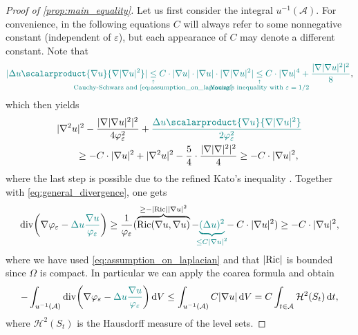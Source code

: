 \documentclass[draft]{amsart}
\newcommand*{\mathcomma}{,}
\DeclarePairedDelimiter{\parens}{(}{)}
\let\p\parens %
\newcommand{\underrelate}[4][]{\underset{\overset{\csname #1\endcsname{#2}}{\mathclap{#3}}}{#4}}
\newcommand{\explain}[3][]{\underrelate[#1]{\uparrow}{#2}{#3}}
\newcommand*{\laplacian}{\Delta}
\DeclareMathOperator{\divergence}{div}
\DeclarePairedDelimiter{\abs}{\lvert}{\rvert} %
\newcommand{\inverse}[1]{{#1}^{-1}}
\newcommand{\Ricci}{\mathrm{Ric}} %
\begin{document}
\begin{proof}[Proof of \cref{prop:main_equality}]
    Let us first consider the integral \( \inverse{u}(\mathcal{A}) \). For convenience, in the following equations \( C \) will always refer to some nonnegative constant (independent of \( \varepsilon \)), but each appearance of \( C \) may denote a different constant. Note that
    \begin{equation*}
        \nonHarmonic{\abs{\laplacian u \scalarproduct{\nabla u}{\nabla \abs{\nabla u}^2}}\explain{\text{Cauchy-Schwarz and \cref{eq:assumption_on_laplacian}}}{\leq} C\cdot \abs{\nabla u}\cdot \abs{\nabla u}\cdot \abs{\nabla \abs{\nabla u}^2}\explain{\text{Young's inequality with \( \varepsilon=1/2 \)}}{\leq}C\cdot \abs{\nabla u}^4+\frac{\abs{\nabla \abs{\nabla u}^2}^2}{8}},
    \end{equation*}
    which then yields
    \begin{align*}
        &\abs{\nabla^2 u}^2-\frac{\abs{\nabla \abs{\nabla u}^2}^2}{4\varphi_\varepsilon^2}+\nonHarmonic{\frac{\laplacian u \scalarproduct{\nabla u}{\nabla \abs{\nabla u}^2}}{2\varphi_{\varepsilon}^2}}\\
        &\qquad \geq -C\cdot \abs{\nabla u}^2+\abs{\nabla^2 u}^2-\frac{5}{4}\cdot \frac{\abs{\nabla\abs{\nabla}^2}^2}{4}\geq -C \cdot \abs{\nabla u}^2,
    \end{align*}
    where the last step is possible due to the refined Kato's inequality \cite[Eq. (C.2)]{braySpacetimeHarmonicFunctions2021}. Together with \cref{eq:general_divergence}, one gets
    \begin{equation*}
        \divergence\p*{\nabla \varphi_{\varepsilon}-\nonHarmonic{\laplacian u \frac{\nabla u}{\varphi_{\varepsilon}}}}\geq \frac{1}{\varphi_{\varepsilon}}(\overbrace{\Ricci(\nabla u,\nabla u)}^{\mathclap{{}\geq -\abs{\Ricci}\abs{\nabla u}^2}}-\nonHarmonic{\underbrace{(\laplacian u)^2}_{\mathclap{\leq C\abs{\nabla u}^2}}}{}- C\cdot \abs{\nabla u}^2)\geq -C\cdot \abs{\nabla u}^2,
    \end{equation*}
    where we have used \cref{eq:assumption_on_laplacian} and that \( \abs{\Ricci} \) is bounded since \( \Omega \) is compact. In particular we can apply the coarea formula and obtain
    \begin{equation}
            -\int_{\inverse{u}(\mathcal{A})}\divergence\p*{\nabla \varphi_{\varepsilon}-\nonHarmonic{\laplacian u \frac{\nabla u}{\varphi_{\varepsilon}}}}\odif{V}\leq \int_{\inverse{u}(\mathcal{A})}C\abs{\nabla u}\odif{V}= C\int_{t\in \mathcal{A}}\mathcal{H}^2(S_t)\odif{t}\mathcomma\label{eq:inequality_near_critical_points}
    \end{equation}
    where \( \mathcal{H}^2(S_t) \) is the Hausdorff measure of the level sets.



\end{proof}
\end{document}
